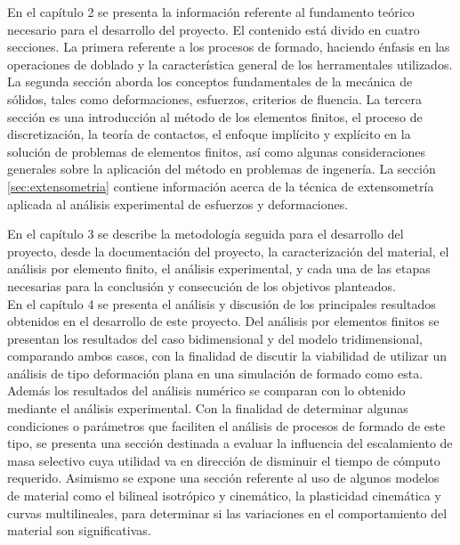 En el capítulo 2 se presenta la información referente al fundamento teórico necesario para el 
desarrollo del proyecto. El contenido está divido en cuatro secciones. La primera referente 
a los procesos de formado, haciendo énfasis en las operaciones de doblado y la 
característica general de los herramentales utilizados. La segunda sección aborda 
los conceptos fundamentales de la mecánica de sólidos, tales como deformaciones, esfuerzos, 
criterios de fluencia. La tercera sección es una introducción al método de los elementos finitos, 
el proceso de discretización, la teoría de contactos, el enfoque implícito y explícito en 
la solución de problemas de elementos finitos, así como algunas consideraciones generales 
sobre la aplicación del método en problemas de ingenería. La sección \ref{sec:extensometria} 
contiene información acerca de la técnica de extensometría aplicada al análisis experimental 
de esfuerzos y deformaciones.

En el capítulo 3 se describe la metodología seguida para el desarrollo del proyecto, 
desde la documentación del proyecto, la caracterización del material, el análisis por 
elemento finito, el análisis experimental, y cada una de las etapas necesarias para 
la conclusión y consecución de los objetivos planteados.\\

En el capítulo 4 se presenta el análisis y discusión de los principales resultados 
obtenidos en el desarrollo de este proyecto. Del análisis por elementos finitos 
se presentan los resultados del caso bidimensional y del modelo tridimensional, comparando 
ambos casos, con la finalidad de discutir la viabilidad de utilizar un análisis de tipo 
deformación plana en una simulación de formado como esta. Además los resultados del 
análisis numérico se comparan con lo obtenido mediante el análisis experimental.
Con la finalidad de determinar algunas condiciones o parámetros que faciliten 
el análisis de procesos de formado de este tipo, se presenta una sección destinada 
a evaluar la influencia del escalamiento de masa selectivo cuya utilidad va en 
dirección de disminuir el tiempo de cómputo requerido. Asimismo se expone una sección 
referente al uso de algunos modelos de material como el bilineal isotrópico y cinemático, 
la plasticidad cinemática y curvas multilineales, para determinar si las variaciones 
en el comportamiento del material son significativas.